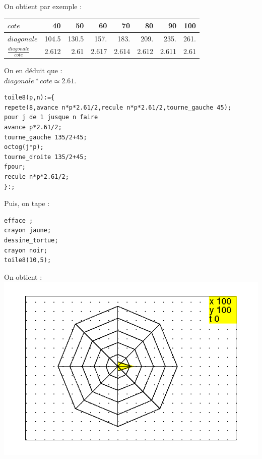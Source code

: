 \documentclass[a4paper,11pt]{book}
\begin{document}
On obtient par exemple :\\
\begin{tabular}{|l|r|r|r|r|r|r|r|}
\hline
$cote$&40&50&60&70&80&90&100\\
\hline
$diagonale$&104.5&130.5&157.&183.&209.&235.&261.\\
\hline
$\frac{diagonale}{cote}$&2.612&2.61&2.617&2.614&2.612&2.611&2.61\\
\hline
\end{tabular}

On en d\'eduit que :\\
$diagonale*cote\simeq 2.61$.\\
\begin{verbatim}
toile8(p,n):={
repete(8,avance n*p*2.61/2,recule n*p*2.61/2,tourne_gauche 45);
pour j de 1 jusque n faire 
avance p*2.61/2;
tourne_gauche 135/2+45;
octog(j*p);
tourne_droite 135/2+45;
fpour;
recule n*p*2.61/2;
}:;
\end{verbatim}
Puis, on tape :
\begin{verbatim}
efface ;
crayon jaune;
dessine_tortue;
crayon noir;
toile8(10,5);
\end{verbatim}
On obtient :
\includegraphics[width=\textwidth]{tortaraign8}
\end{document}
